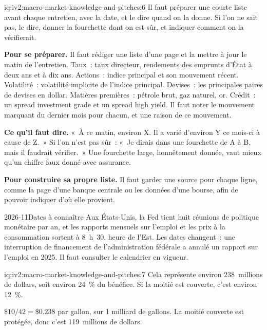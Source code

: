 \begin{solution}{iq:iv2:macro-market-knowledge-and-pitches:6}
Il faut préparer une courte liste avant chaque entretien, avec la date, et le dire quand on la donne. Si l'on ne sait pas, le dire, donner la fourchette dont on est sûr, et indiquer comment on la vérifierait.

\textbf{Pour se préparer.} Il faut rédiger une liste d'une page et la mettre à jour le matin de l'entretien. Taux~: taux directeur, rendements des emprunts d'État à deux ans et à dix ans. Actions~: indice principal et son mouvement récent. Volatilité~: volatilité implicite de l'indice principal. Devises~: les principales paires de devises en dollar. Matières premières~: pétrole brut, gaz naturel, or. Crédit~: un spread investment grade et un spread high yield. Il faut noter le mouvement marquant du dernier mois pour chacun, et une raison de ce mouvement.

\textbf{Ce qu'il faut dire.} «~À ce matin, environ X. Il a varié d'environ Y ce mois-ci à cause de Z.~» Si l'on n'est pas sûr~: «~Je dirais dans une fourchette de A à B, mais il faudrait vérifier.~» Une fourchette large, honnêtement donnée, vaut mieux qu'un chiffre faux donné avec assurance.

\textbf{Pour construire sa propre liste.} Il faut garder une source pour chaque ligne, comme la page d'une banque centrale ou les données d'une bourse, afin de pouvoir indiquer d'où elle provient.

\begin{dated}{2026-11}{Dates à connaître}\label{dat:iv2:macro-market-knowledge-and-pitches:cal}
Aux États-Unis, la Fed tient huit réunions de politique monétaire par an, et les rapports mensuels sur l'emploi et les prix à la consommation sortent à 8~h~30, heure de l'Est. Les dates changent~: une interruption de financement de l'administration fédérale a annulé un rapport sur l'emploi en 2025. Il faut consulter le calendrier en vigueur.
\end{dated}

\end{solution}

\begin{solution}{iq:iv2:macro-market-knowledge-and-pitches:7}
Cela représente environ 238~millions de dollars, soit environ 24~\% du bénéfice. Si la moitié est couverte, c'est environ 12~\%.

$\$10/42 = \$0.238$ par gallon, sur 1 milliard de gallons. La moitié couverte est protégée, donc c'est 119~millions de dollars.

\end{solution}

